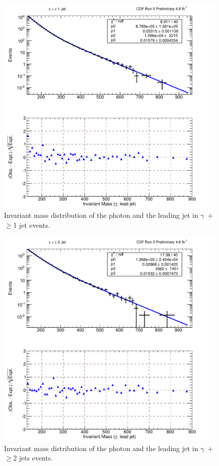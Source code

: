 \begin{figure}[htb!]
\centering
\includegraphics[scale=\resultsMassFitScale,keepaspectratio=true]{gjets_pj1_pj1MassFit.pdf}
\caption{Invariant mass distribution of the photon and the leading jet in $\gamma$~+ $\geq$1 jet events.}
\label{fig:MassFit_pj1_pj}
\end{figure}

 \begin{figure}[htb!]
\centering
\includegraphics[scale=\resultsMassFitScale,keepaspectratio=true]{gjets_pj2_pj1MassFit.pdf}
\caption{Invariant mass distribution of the photon and the leading jet in $\gamma$~+ $\geq$2 jets events.}
\label{fig:MassFit_pj2_pj}
\end{figure}

